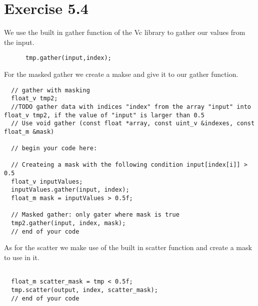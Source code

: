 \documentclass[a4paper]{article}
\begin{document}
\section*{Exercise 5.4}
We use the built in gather function of the Vc library to gather our values from the input.

\begin{lstlisting}
      tmp.gather(input,index);
\end{lstlisting}

For the masked gather we create a makse and give it to our gather function.

\begin{lstlisting}
  // gather with masking
  float_v tmp2;
  //TODO gather data with indices "index" from the array "input" into float_v tmp2, if the value of "input" is larger than 0.5
  // Use void gather (const float *array, const uint_v &indexes, const float_m &mask)

  // begin your code here:

  // Createing a mask with the following condition input[index[i]] > 0.5 
  float_v inputValues;
  inputValues.gather(input, index);
  float_m mask = inputValues > 0.5f;

  // Masked gather: only gater where mask is true
  tmp2.gather(input, index, mask);
  // end of your code
\end{lstlisting}

As for the scatter we make use of the built in scatter function and create a mask to use in it.

\begin{lstlisting}
    
  float_m scatter_mask = tmp < 0.5f;
  tmp.scatter(output, index, scatter_mask);
  // end of your code
\end{lstlisting}
\end{document}
